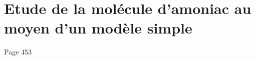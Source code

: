 \chapter{Etude de la molécule d'amoniac au moyen d'un modèle simple}
\label{chapter:molecule_amoniac}
Page 453
